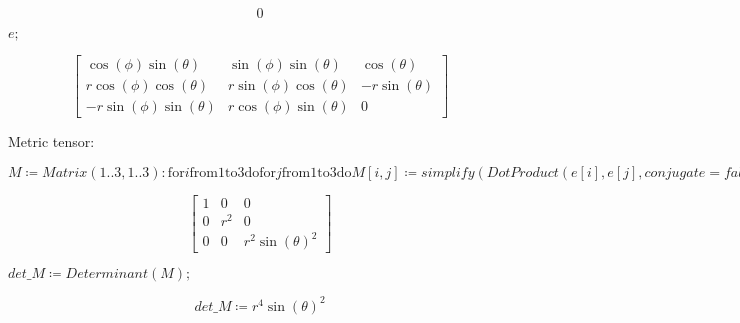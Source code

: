 \documentclass{article}
\begin{document}
\begin{dmath}\label{(3)}
0
\end{dmath}
\begin{Maple Normal}
{$ \displaystyle e ; $}
\end{Maple Normal}
\begin{dmath}\label{(4)}
\left[\begin{array}{ccc}
\cos \! \left(\phi \right) \sin \! \left(\theta \right) & \sin \! \left(\phi \right) \sin \! \left(\theta \right) & \cos \! \left(\theta \right) 
\\
 r \cos \! \left(\phi \right) \cos \! \left(\theta \right) & r \sin \! \left(\phi \right) \cos \! \left(\theta \right) & -r \sin \! \left(\theta \right) 
\\
 -r \sin \! \left(\phi \right) \sin \! \left(\theta \right) & r \cos \! \left(\phi \right) \sin \! \left(\theta \right) & 0 
\end{array}\right]
\end{dmath}
\begin{Maple Normal}
Metric tensor:
\end{Maple Normal}
\begin{Maple Normal}

\end{Maple Normal}
\begin{Maple Normal}
{$ \displaystyle M \coloneqq \mathit{Matrix} (1..3,1..3)\colon \boldsymbol{\mathrm{for}}i \boldsymbol{\mathrm{from}}1\boldsymbol{\mathrm{to}}3\boldsymbol{\mathrm{do}}\boldsymbol{\mathrm{for}}j \boldsymbol{\mathrm{from}}1\boldsymbol{\mathrm{to}}3\boldsymbol{\mathrm{do}}M [i ,j]\coloneqq \mathit{simplify} (\mathit{DotProduct} (e [i],e [j],\mathit{conjugate} =\mathit{false}),\mathit{assume} =[0<x [2]]);\boldsymbol{\mathrm{end}}\boldsymbol{\mathrm{do}};\boldsymbol{\mathrm{end}}\boldsymbol{\mathrm{do}};M ; $}
\end{Maple Normal}
\begin{dmath}\label{(5)}
\left[\begin{array}{ccc}
1 & 0 & 0 
\\
 0 & r^{2} & 0 
\\
 0 & 0 & r^{2} \sin \! \left(\theta \right)^{2} 
\end{array}\right]
\end{dmath}
\begin{Maple Normal}
{$ \displaystyle \textit{det\_M} \coloneqq \mathit{Determinant} (M); $}
\end{Maple Normal}
\begin{dmath}\label{(6)}
\textit{det\_M} \coloneqq r^{4} \sin \! \left(\theta \right)^{2}
\end{dmath}
\end{document}
